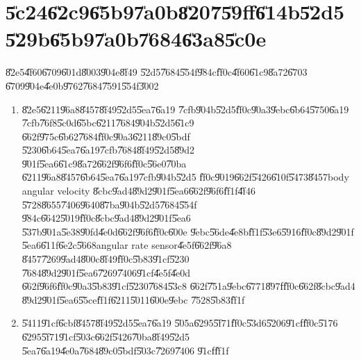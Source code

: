 \documentclass[12pt,a4paper]{article}
\begin{document}
%

\part{\U{5c24}\U{62c9}\U{65b9}\U{7a0b}\U{8207}\U{59ff}\U{614b}\U{52d5}%
\U{529b}\U{65b9}\U{7a0b}\U{7684}\U{63a8}\U{5c0e}}

\setcounter{xpage}{1}\U{82e5}\U{4f60}\U{6709}\U{601d}\U{8003}\U{904e}\U{8f49}%
\U{52d5}\U{7684}\U{554f}\U{984c}\U{ff0c}\U{4f60}\U{61c9}\U{8a72}\U{6703}%
\U{6709}\U{904e}\U{4e0b}\U{9762}\U{7684}\U{7591}\U{554f}\U{3002}

\begin{enumerate}
\item \U{82e5}\U{6211}\U{96a8}\U{8457}\U{8f49}\U{52d5}\U{5ea7}\U{6a19}%
\U{7cfb}\U{904b}\U{52d5}\U{ff0c}\U{90a3}\U{9ebc}\U{6b64}\U{5750}\U{6a19}%
\U{7cfb}\U{76f8}\U{5c0d}\U{65bc}\U{6211}\U{7684}\U{904b}\U{52d5}\U{61c9}%
\U{662f}\U{975c}\U{6b62}\U{7684}\U{ff0c}\U{90a3}\U{6211}\U{89c0}\U{5bdf}%
\U{5230}\U{6b64}\U{5ea7}\U{6a19}\U{7cfb}\U{7684}\U{8f49}\U{52d5}\U{89d2}%
\U{901f}\U{5ea6}\U{61c9}\U{8a72}\U{662f}\U{96f6}\U{ff0c}\U{56e0}\U{70ba}%
\U{6211}\U{96a8}\U{8457}\U{6b64}\U{5ea7}\U{6a19}\U{7cfb}\U{904b}\U{52d5}%
\U{ff0c}\U{9019}\U{662f}\U{5426}\U{610f}\U{5473}\U{8457}body angular velocity%
\U{8cbc}\U{9ad4}\U{89d2}\U{901f}\U{5ea6}\U{662f}\U{96f6}\U{ff1f}\U{4f46}%
\U{5728}\U{8655}\U{7406}\U{9640}\U{87ba}\U{904b}\U{52d5}\U{7684}\U{554f}%
\U{984c}\U{6642}\U{5019}\U{ff0c}\U{8cbc}\U{9ad4}\U{89d2}\U{901f}\U{5ea6}%
\U{537b}\U{901a}\U{5e38}\U{90fd}\U{4e0d}\U{662f}\U{96f6}\U{ff0c}\U{600e}%
\U{9ebc}\U{56de}\U{4e8b}\U{ff1f}\U{53e6}\U{5916}\U{ff0c}\U{89d2}\U{901f}%
\U{5ea6}\U{611f}\U{6e2c}\U{5668}angular rate sensor\U{4e5f}\U{662f}\U{96a8}%
\U{8457}\U{7269}\U{9ad4}\U{800c}\U{8f49}\U{ff0c}\U{5b83}\U{91cf}\U{5230}%
\U{7684}\U{89d2}\U{901f}\U{5ea6}\U{7269}\U{7406}\U{91cf}\U{4e5f}\U{4e0d}%
\U{662f}\U{96f6}\U{ff0c}\U{90a3}\U{5b83}\U{91cf}\U{5230}\U{7684}\U{53c8}%
\U{662f}\U{751a}\U{9ebc}\U{6771}\U{897f}\U{ff0c}\U{662f}\U{8cbc}\U{9ad4}%
\U{89d2}\U{901f}\U{5ea6}\U{55ce}\U{ff1f}\U{6211}\U{5011}\U{600e}\U{9ebc}%
\U{7528}\U{5b83}\U{ff1f}

\item \U{5411}\U{91cf}\U{6cbf}\U{8457}\U{8f49}\U{52d5}\U{5ea7}\U{6a19}%
\U{505a}\U{6295}\U{5f71}\U{ff0c}\U{53d6}\U{5206}\U{91cf}\U{ff0c}\U{5176}%
\U{6295}\U{5f71}\U{91cf}\U{503c}\U{662f}\U{5426}\U{70ba}\U{8f49}\U{52d5}%
\U{5ea7}\U{6a19}\U{4e0a}\U{7684}\U{89c0}\U{5bdf}\U{503c}\U{7269}\U{7406}%
\U{91cf}\U{ff1f}


\end{enumerate}
\end{document}

